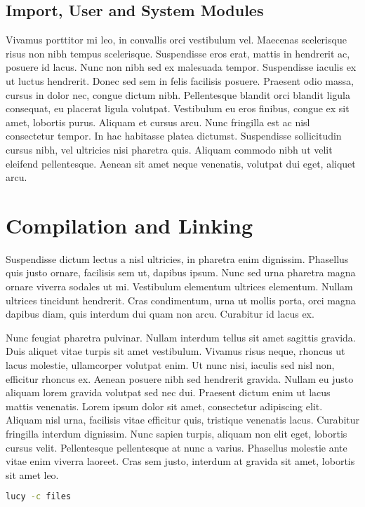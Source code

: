\subsection{Import, User and System Modules}
Vivamus porttitor mi leo, in convallis orci vestibulum vel. Maecenas scelerisque risus non nibh tempus scelerisque. Suspendisse eros erat, mattis in hendrerit ac, posuere id lacus. Nunc non nibh sed ex malesuada tempor. Suspendisse iaculis ex ut luctus hendrerit. Donec sed sem in felis facilisis posuere. Praesent odio massa, cursus in dolor nec, congue dictum nibh. Pellentesque blandit orci blandit ligula consequat, eu placerat ligula volutpat. Vestibulum eu eros finibus, congue ex sit amet, lobortis purus. Aliquam et cursus arcu. Nunc fringilla est ac nisl consectetur tempor. In hac habitasse platea dictumst. Suspendisse sollicitudin cursus nibh, vel ultricies nisi pharetra quis. Aliquam commodo nibh ut velit eleifend pellentesque. Aenean sit amet neque venenatis, volutpat dui eget, aliquet arcu.


\section{Compilation and Linking}
Suspendisse dictum lectus a nisl ultricies, in pharetra enim dignissim. Phasellus quis justo ornare, facilisis sem ut, dapibus ipsum. Nunc sed urna pharetra magna ornare viverra sodales ut mi. Vestibulum elementum ultrices elementum. Nullam ultrices tincidunt hendrerit. Cras condimentum, urna ut mollis porta, orci magna dapibus diam, quis interdum dui quam non arcu. Curabitur id lacus ex.

Nunc feugiat pharetra pulvinar. Nullam interdum tellus sit amet sagittis gravida. Duis aliquet vitae turpis sit amet vestibulum. Vivamus risus neque, rhoncus ut lacus molestie, ullamcorper volutpat enim. Ut nunc nisi, iaculis sed nisl non, efficitur rhoncus ex. Aenean posuere nibh sed hendrerit gravida. Nullam eu justo aliquam lorem gravida volutpat sed nec dui. Praesent dictum enim ut lacus mattis venenatis. Lorem ipsum dolor sit amet, consectetur adipiscing elit. Aliquam nisl urna, facilisis vitae efficitur quis, tristique venenatis lacus. Curabitur fringilla interdum dignissim. Nunc sapien turpis, aliquam non elit eget, lobortis cursus velit. Pellentesque pellentesque at nunc a varius. Phasellus molestie ante vitae enim viverra laoreet. Cras sem justo, interdum at gravida sit amet, lobortis sit amet leo.
\begin{lstlisting}[language=Bash]
  lucy -c files
\end{lstlisting}
